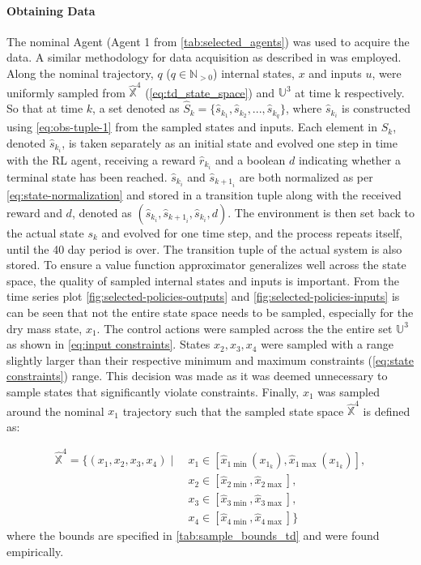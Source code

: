 \paragraph{Obtaining Data}
The nominal Agent (Agent 1 from \autoref{tab:selected_agents}) was used to acquire the data. A similar methodology for data acquisition as described in \cite{linReinforcementLearningBasedModel2023} was employed. Along the nominal trajectory, $q$ ($q \in \mathbb{N}_{>0}$) internal states, $x$ and inputs $u$, were uniformly sampled from $\hat{\mathbb{X}}^4$ (\autoref{eq:td_state_space}) and ${\mathbb{U}}^3$ at time k respectively. So that at time $k$, a set denoted as $\hat{S}_{k} = \{\hat{s}_{k_1},\hat{s}_{k_2},...,\hat{s}_{k_q}\}$, where $\hat{s}_{k_i}$ is constructed using \autoref{eq:obs-tuple-1} from the sampled states and inputs. Each element in $\hat{S}_k$, denoted $\hat{s}_{k_i}$, is taken separately as an initial state and evolved one step in time with the RL agent, receiving a reward $\hat{r}_{k_i}$ and a boolean $d$ indicating whether a terminal state has been reached. $\hat{s}_{k_i}$ and $\hat{s}_{{k+1}_i}$ are both normalized as per \autoref{eq:state-normalization} and stored in a transition tuple along with the received reward and $d$, denoted as $(\hat{s}_{k_i},\hat{s}_{{k+1}_i},\hat{s}_{k_i},d)$. The environment is then set back to the actual state $s_k$ and evolved for one time step, and the process repeats itself, until the 40 day period is over. The transition tuple of the actual system is also stored. To ensure a value function approximator generalizes well across the state space, the quality of sampled internal states and inputs is important. From the time series plot \autoref{fig:selected-policies-outputs} and \autoref{fig:selected-policies-inputs} is can be seen that not the entire state space needs to be sampled, especially for the dry mass state, $x_1$. The control actions were sampled across the the entire set $\mathbb{U}^3$ as shown in \autoref{eq:input constraints}. States $x_2,x_3,x_4$ were sampled with a range slightly larger than their respective minimum and maximum constraints (\autoref{eq:state constraints}) range. This decision was made as it was deemed unnecessary to sample states that significantly violate constraints.  Finally, $x_1$ was sampled around the nominal $x_1$ trajectory such that the sampled state space $\hat{\mathbb{X}}^4$ is defined as:



\begin{equation}\label{eq:td_state_space}
\begin{split}
\hat{\mathbb{X}}^4 = \{ (x_1, x_2, x_3, x_4) \mid\ & x_1 \in [\hat{x}_{1\min}(x_{1_k}), \hat{x}_{1\max}(x_{1_k})], \\
& x_2 \in [\hat{x}_{2\min}, \hat{x}_{2\max}], \\
& x_3 \in [\hat{x}_{3\min}, \hat{x}_{3\max}], \\
& x_4 \in [\hat{x}_{4\min}, \hat{x}_{4\max}] \}
\end{split}
\end{equation}
where the bounds are specified in \autoref{tab:sample_bounds_td} and were found empirically.

